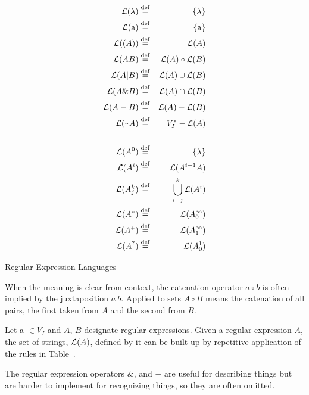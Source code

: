 \begin{table}
\begin{eqnarray*}
{\cal L}(\lambda) &\eqldef& \{\lambda\}                                 \\
{\cal L}({\rm a}) &\eqldef& \{{\rm a}\}                                 \\
{\cal L}((A))     &\eqldef& {\cal L}(A)                                 \\
{\cal L}(A B)   &\eqldef& {\cal L}(A)\circ{\cal L}(B)                   \\
{\cal L}(A|B)   &\eqldef& {\cal L}(A) \cup {\cal L}(B)                  \\
{\cal L}(A\&B)  &\eqldef& {\cal L}(A) \cap {\cal L}(B)                  \\
{\cal L}(A-B)&\eqldef& {\cal L}(A) - {\cal L}(B)                        \\
{\cal L}(\mbox{\tw}A)&\eqldef& V_I^* - {\cal L}(A)		                \\
\nonumber && \\
{\cal L}(A^0)   &\eqldef& \{\lambda\}                                   \\
{\cal L}(A^i)   &\eqldef& {\cal L}(A^{i-1}A)                            \\
{\cal L}(A^k_j) &\eqldef& \bigcup_{i=j}^k {\cal L}(A^i)	                \\
{\cal L}(A^*)   &\eqldef& {\cal L}(A^\infty_0)                          \\
{\cal L}(A^{\scriptscriptstyle+})&\eqldef& {\cal L}(A^\infty_1)         \\
{\cal L}(A^?)   &\eqldef& {\cal L}(A^1_0)
\end{eqnarray*}
\caption{Regular Expression Languages}
\end{table}

\noindent 
When the meaning is clear from context, the catenation operator
$a \circ b$ is often implied by the juxtaposition $ a\ b$.  
Applied to sets $A \circ B$ means the catenation of all pairs,
the first taken from $A$ and the second from $B$.

Let a $\in V_I$ and $A$, $B$ designate regular expressions.  
Given a regular expression $A$, the set of strings,
${\cal L}(A)$, defined by it can be built up by repetitive application
of the rules in Table~\thetable.  

The regular expression operators $\&$, \tw and $-$ are useful for 
describing things but are harder to implement for recognizing things,
so they are often omitted.

